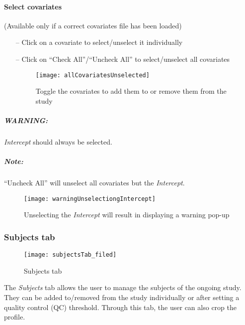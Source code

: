 \documentclass[fadttsterUserGuide_use]{subfiles}
\begin{document}
	\paragraph{Select covariates}
	(Available only if a correct covariates file has been loaded)
	\begin{itemize}
		\item[--] Click on a covariate to select/unselect it individually
		\item[--] Click on ``Check All''/``Uncheck All'' to select/unselect all covariates
		\begin{figure}[H]
  			\texttt{[image: allCovariatesUnselected]}
  			\caption{Toggle the covariates to add them to or remove them from the study}
    		\label{fig:covariatesSelection}
		\end{figure}
	\end{itemize}
	\subparagraph{\textbf{WARNING:}} \textit{Intercept} should always be selected.
	\subparagraph{\textbf{Note:}}``Uncheck All'' will unselect all covariates but the \textit{Intercept}.
	\begin{figure}[H]
  		\texttt{[image: warningUnselectiongIntercept]}
  		\caption{Unselecting the \textit{Intercept} will result in displaying a warning pop-up}
    	\label{fig:unselectIntercept}
	\end{figure}
	\vfill
	\newpage
	
	\subsubsection{Subjects tab}
	\begin{figure}[H]
  		\texttt{[image: subjectsTab\_filed]}
  		\caption{Subjects tab}
    	\label{fig:subjectsTab_blank}
	\end{figure}
	The \textit{Subjects} tab allows the user to manage the subjects of the ongoing study. They can be added to/removed from the study individually or after setting a quality control (QC) threshold. Through this tab, the user can also crop the profile.
	\vfill
	\newpage
\end{document}
